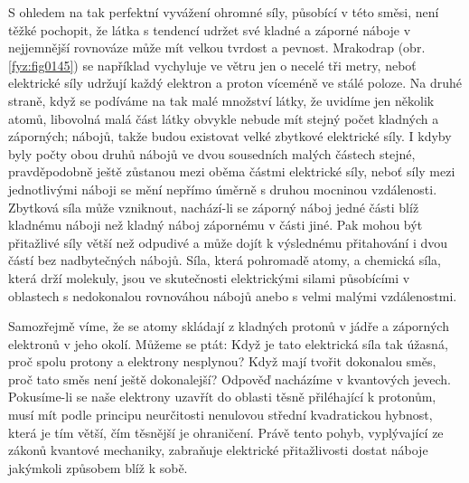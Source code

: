     S ohledem na tak perfektní vyvážení ohromné síly, působící v této směsi, není těžké pochopit, že
    látka s tendencí udržet své kladné a záporné náboje v nejjemnější rovnováze může mít velkou
    tvrdost a pevnost. Mrakodrap \wikiELB (obr. \ref{fyz:fig0145}) se například vychyluje ve větru
    jen o necelé tři metry, neboť elektrické síly udržují každý elektron a proton víceméně ve stálé
    poloze. Na druhé straně, když se podíváme na tak malé množství látky, že uvidíme jen několik
    atomů, libovolná malá část látky obvykle nebude mít stejný počet kladných a záporných; nábojů,
    takže budou existovat velké zbytkové elektrické síly. I kdyby byly počty obou druhů nábojů ve
    dvou sousedních malých částech stejné, pravděpodobně ještě zůstanou mezi oběma částmi elektrické
    síly, neboť síly mezi jednotlivými náboji se mění nepřímo úměrně s druhou mocninou vzdálenosti.
    Zbytková síla může vzniknout, nachází-li se záporný náboj jedné části blíž kladnému náboji než
    kladný náboj zápornému v části jiné. Pak mohou být přitažlivé síly větší než odpudivé a může
    dojít k výslednému přitahování i dvou částí bez nadbytečných nábojů. Síla, která 
    pohromadě atomy, a chemická síla, která drží molekuly, jsou ve skutečnosti elektrickými silami
    působícími v oblastech s nedokonalou rovnováhou nábojů anebo s velmi malými vzdálenostmi.

    Samozřejmě víme, že se atomy skládají z kladných protonů v jádře a záporných elektronů v jeho 
    okolí. Můžeme se ptát: Když je tato elektrická síla tak úžasná, proč spolu protony a elektrony 
    nesplynou? Když mají tvořit dokonalou směs, proč tato směs není ještě dokonalejší? Odpověď 
    nacházíme v kvantových jevech. Pokusíme-li se naše elektrony uzavřít do oblasti těsně 
    přiléhající k protonům, musí mít podle principu neurčitosti nenulovou střední kvadratickou 
    hybnost, která je tím větší, čím těsnější je ohraničení. Právě tento pohyb, vyplývající ze 
    zákonů kvantové mechaniky, zabraňuje elektrické přitažlivosti dostat náboje jakýmkoli způsobem 
    blíž k sobě.
    
